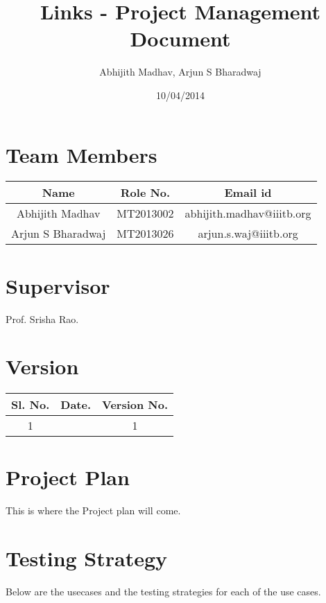 \documentclass[11pt]{report} %
\title{Links - Project Management Document}
\author{Abhijith Madhav, Arjun S Bharadwaj}
\date{} %
\begin{document}
\maketitle
\section*{Team Members}
\begin{tabular}{ | c | c | c | }
\hline            
  Name & Role No. & Email id \\
  \hline  
  \hline  
  Abhijith Madhav & MT2013002 & abhijith.madhav@iiitb.org \\
  \hline  
  Arjun S Bharadwaj & MT2013026 & arjun.s.waj@iiitb.org \\  
\hline  
\end{tabular}

\maketitle
\section*{Supervisor}
Prof. Srisha Rao.

\maketitle
\section*{Version}
\begin{tabular}{ | c | c | c | }
\hline            
  Sl. No. & Date. & Version No. \\
\hline  
\hline  
  1 & \date{10/04/2014} & 1 \\
\hline  
\end{tabular}

\maketitle
\section*{Project Plan}
This is where the Project plan will come.


\maketitle
\section*{Testing Strategy}
Below are the usecases and the testing strategies for each of the use cases.
\end{document}

